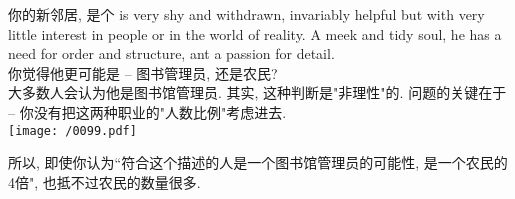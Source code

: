\documentclass[UTF8]{ctexart}
\begin{document}
	

\begin{myEnvSample}
	你的新邻居, 是个 is very shy and withdrawn, invariably helpful but with very little interest in people or in the world of reality. A meek and tidy soul, he has a need for order and structure, ant a passion for detail. \\
	你觉得他更可能是 -- 图书管理员, 还是农民? \\
	大多数人会认为他是图书馆管理员. 其实, 这种判断是"非理性"的. 问题的关键在于 -- 你没有把这两种职业的"人数比例"考虑进去. \\
	
	\texttt{[image: /0099.pdf]}
	
	所以, 即使你认为``符合这个描述的人是一个图书馆管理员的可能性, 是一个农民的4倍", 也抵不过农民的数量很多.
\end{myEnvSample}
\end{document}
